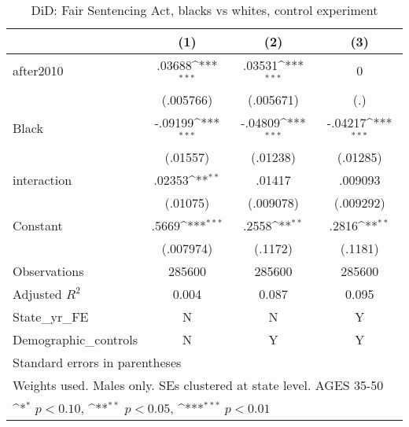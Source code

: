 \begin{table}[htbp]\centering
\def\sym#1{\ifmmode^{#1}\else\(^{#1}\)\fi}
\caption{DiD: Fair Sentencing Act, blacks vs whites, control experiment}
\begin{tabular}{l*{3}{c}}
\hline\hline
                    &\multicolumn{1}{c}{(1)}         &\multicolumn{1}{c}{(2)}         &\multicolumn{1}{c}{(3)}         \\
\hline
after2010           &      .03688\sym{***}&      .03531\sym{***}&           0         \\
                    &   (.005766)         &   (.005671)         &         (.)         \\
[1em]
Black               &     -.09199\sym{***}&     -.04809\sym{***}&     -.04217\sym{***}\\
                    &    (.01557)         &    (.01238)         &    (.01285)         \\
[1em]
interaction         &      .02353\sym{**} &      .01417         &     .009093         \\
                    &    (.01075)         &   (.009078)         &   (.009292)         \\
[1em]
Constant            &       .5669\sym{***}&       .2558\sym{**} &       .2816\sym{**} \\
                    &   (.007974)         &     (.1172)         &     (.1181)         \\
\hline
Observations        &      285600         &      285600         &      285600         \\
Adjusted \(R^{2}\)  &       0.004         &       0.087         &       0.095         \\
State\_yr\_FE         &           N         &           N         &           Y         \\
Demographic\_controls&           N         &           Y         &           Y         \\
\hline\hline
\multicolumn{4}{l}{\footnotesize Standard errors in parentheses}\\
\multicolumn{4}{l}{\footnotesize Weights used. Males only. SEs clustered at state level. AGES 35-50}\\
\multicolumn{4}{l}{\footnotesize \sym{*} \(p<0.10\), \sym{**} \(p<0.05\), \sym{***} \(p<0.01\)}\\
\end{tabular}
\end{table}
